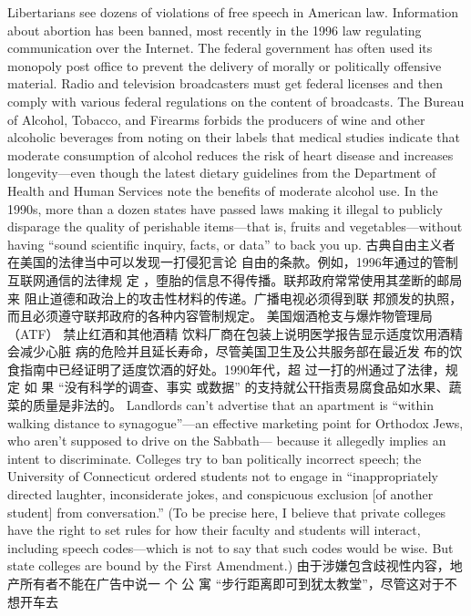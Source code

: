 \begin{paracol}{2}
\switchcolumn*
Libertarians see dozens of violations of free speech in American law. Information about abortion has been banned, most recently in the 1996 law regulating communication over the Internet. The federal government has often used its monopoly
post office to prevent the delivery of morally or politically offensive material. Radio and television broadcasters must get
federal licenses and then comply with various federal regulations on the content of broadcasts. The Bureau of Alcohol, Tobacco, and Firearms forbids the producers of wine and other
alcoholic beverages from noting on their labels that medical
studies indicate that moderate consumption of alcohol reduces
the risk of heart disease and increases longevity---even though
the latest dietary guidelines from the Department of Health
and Human Services note the benefits of moderate alcohol use.
In the 1990s, more than a dozen states have passed laws making it illegal to publicly disparage the quality of perishable
items---that is, fruits and vegetables---without having ``sound
scientific inquiry, facts, or data'' to back you up.
\switchcolumn
古典自由主义者在美国的法律当中可以发现一打侵犯言论
自由的条款。例如，1996年通过的管制互联网通信的法律规
定 ，堕胎的信息不得传播。联邦政府常常使用其垄断的邮局来
阻止道德和政治上的攻击性材料的传递。广播电视必须得到联
邦颁发的执照，而且必须遵守联邦政府的各种内容管制规定。
美国烟酒枪支与爆炸物管理局（ATF） 禁止红酒和其他酒精
饮料厂商在包装上说明医学报告显示适度饮用酒精会减少心脏
病的危险并且延长寿命，尽管美国卫生及公共服务部在最近发
布的饮食指南中已经证明了适度饮酒的好处。1990年代，超
过一打的州通过了法律，规 定 如 果 “没有科学的调查、事实
或数据” 的支持就公幵指责易腐食品如水果、蔬菜的质量是非法的。
\switchcolumn*
Landlords can't advertise that an apartment is ``within walking distance to synagogue''---an effective marketing point for
Orthodox Jews, who aren't supposed to drive on the Sabbath---
because it allegedly implies an intent to discriminate. Colleges
try to ban politically incorrect speech; the University of Connecticut ordered students not to engage in ``inappropriately directed laughter, inconsiderate jokes, and conspicuous exclusion
[of another student] from conversation.'' (To be precise here, I
believe that private colleges have the right to set rules for how
their faculty and students will interact, including speech
codes---which is not to say that such codes would be wise. But
state colleges are bound by the First Amendment.)
\switchcolumn
由于涉嫌包含歧视性内容，地产所有者不能在广告中说一
个 公 寓 “步行距离即可到犹太教堂”，尽管这对于不想开车去

\end{paracol}
